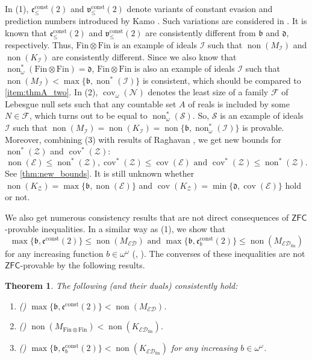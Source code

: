 \documentclass[a4paper,12pt]{amsart}
\newcounter{enuAlph}
\newtheorem{teorema}[enuAlph]{Theorem}
\theoremstyle{definition}
\numberwithin{thm}{section}
\numberwithin{equation}{section}
\newcommand{\oo}{{\omega}^\omega}
\newcommand{\bb}{\mathfrak{b}}
\newcommand{\dd}{\mathfrak{d}}
\newcommand{\ee}{\mathfrak{e}}
\newcommand{\n}{\mathcal{N}}
\DeclareMathOperator{\non}{non}
\DeclareMathOperator{\cov}{cov}
\newcommand{\ed}{\mathcal{ED}}
\newcommand{\I}{\mathscr{I}}
\newcommand{\edfin}{\mathcal{ED}_\mathrm{fin}}
\newcommand{\finfin}{\mathrm{Fin}\otimes\mathrm{Fin}}
\newcommand{\Z}{\mathcal{Z}}
\newcommand{\Solecki}{\mathcal{S}}
\newcommand{\eec}{\ee^{\mathrm{const}}}
\newcommand{\eect}{\ee^{\mathrm{const}}(2)}
\newcommand{\vv}{\mathfrak{v}}
\begin{document}
    In (1), $\ee^{\mathrm{const}}_{\leq}(2)$ and $\vv^{\mathrm{const}}_{\leq}(2)$ denote variants of constant evasion and prediction numbers introduced by Kamo \cite{Kam00}. Such variations are considered in \cite{CR25}. It is known that $\ee^{\mathrm{const}}_{\leq}(2)$ and $\vv^{\mathrm{const}}_{\leq}(2)$ are consistently different from $\bb$ and $\dd$, respectively. Thus, $\finfin$ is an example of ideals $\I$ such that $\non(M_\I)$ and $\non(K_\I)$ are consistently different. Since we also know that $\non^*_\omega(\finfin) = \dd$, $\finfin$ is also an example of ideals $\I$ such that $\non(M_\I) < \max\{\bb, \non^*(\I)\}$ is consistent, which should be compared to \eqref{item:thmA_two}. In (2), $\cov_\omega(\n)$ denotes the least size of a family $\mathcal{F}$ of Lebesgue null sets such that any countable set $A$ of reals is included by some $N\in\mathcal{F}$, which turns out to be equal to $\non^*_\omega(\Solecki)$. So, $\mathcal{S}$ is an example of ideals $\I$ such that $\non(M_\I) = \non(K_\I) = \non\{\bb, \non^*_\omega(\I)\}$ is provable. Moreover, combining (3) with results of Raghavan \cite{Rag20}, we get new bounds for $\non^*(\Z)$ and $\cov^*(\Z)$:
    \[
    \non(\mathcal{E})\leq\non^*(\Z), \cov^*(\Z)\leq\cov(\mathcal{E}) \text{ and }\cov^*(\Z)\leq\non^*(\Z).
    \]
    See \cref{thm:new_bounds}. It is still unknown whether $\non(K_\Z) = \max\{\bb, \non(\mathcal{E})\}$ and $\cov(K_\Z) = \min\{\dd, \cov(\mathcal{E})\}$ hold or not.

    We also get numerous consistency results that are not direct consequences of $\mathsf{ZFC}$-provable inequalities. In a similar way as (1), we show that
    \[
    \max\{\bb, \eect\}\leq\non(M_{\ed})\text{ and }\max\{\bb,\eec_b(2)\}\leq\non(M_{\edfin})
    \]
    for any increasing function $b\in\oo$ (, ). The converses of these inequalities are not $\mathsf{ZFC}$-provable by the following results.
    
    \begin{teorema}\label{mainthm:sep_into_two_values}
        The following (and their duals) consistently hold:
        \begin{enumerate}
            \item \textnormal{()} $\max\{\bb,\eect\}<\non(M_{\ed})$.
            \item \textnormal{()} $\non(M_{\finfin})<\non(K_{\edfin})$.
            \item \textnormal{()} $\max\{\bb,\eec_b(2)\}<\non(K_{\edfin})$ for any increasing $b\in\oo$.
        \end{enumerate}
    \end{teorema}
    
\end{document}
